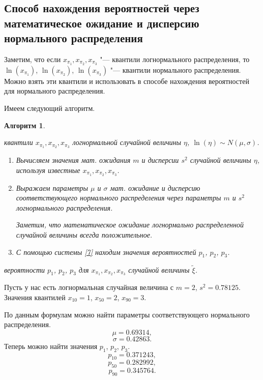 \documentclass[12pt]{article}
\newtheorem{alg}{Алгоритм}
\newenvironment{ex}{\par\noindent{\bf Пример.}}{}
\newenvironment{pr1}{\par\noindent{\bf Дано:}}{}
\newenvironment{pr2}{\par\noindent{\bf Шаги:}}{}
\newenvironment{pr3}{\par\noindent{\bf Результат:}}{}
\begin{document}
	
	\subsection{Способ нахождения вероятностей через математическое ожидание и дисперсию нормального распределения}
	Заметим, что если
	$x_{\pi_{1}}, x_{\pi_{2}}, x_{\pi_{3}}$ "--- квантили логнормального распределения, то $\ln(x_{\pi_{1}})$, $\ln(x_{\pi_{2}})$, $\ln(x_{\pi_{3}})$ "--- квантили нормального распределения. Можно взять эти квантили и использовать в способе нахождения вероятностей для нормального распределения. 
	
	Имеем следующий алгоритм.
	
	\begin{alg}\label{al1}
		\begin{pr1}
			квантили $x_{\pi_{1}}, x_{\pi_{2}}, x_{\pi_{3}}$ логнормальной случайной величины $\eta$, $\ln(\eta) \sim N(\mu, \sigma)$.
		\end{pr1}
		
		\begin{pr2}\end{pr2}
		\begin{enumerate}
			\item Вычисляем значения мат. ожидания $m$ и дисперсии $s^{2}$ случайной величины $\eta$, используя известные $x_{\pi_{1}}, x_{\pi_{2}}, x_{\pi_{3}}$.
			\item Выражаем параметры $\mu$ и $\sigma$ мат. ожидание и дисперсию соответствующего нормального распределения через параметры $m$ и $s^{2}$ логнормального распределения.
			
			Заметим, что математическое ожидание логнормально распределенной случайной величины всегда положительное.
			\item С помощью системы \eqref{7} находим значения вероятностей $p_{1}$, $p_{2}$, $p_{3}$.
		\end{enumerate}
		\begin{pr3}\end{pr3} вероятности $p_{1}$, $p_{2}$, $p_{3}$ для $x_{\pi_{1}}, x_{\pi_{2}}, x_{\pi_{3}}$ случайной величины $\tilde{\xi}$.
		
	\end{alg}
	
	\begin{ex}
		Пусть у нас есть логнормальная случайная величина с $m = 2$, $s^{2} = 0.78125$.
		Значения квантилей $x_{10} = 1$, $x_{50} = 2$, $x_{90} = 3$.
		
		По данным формулам можно найти параметры соответствующего нормального распределения.
		\[\mu=0.69314,\] 
		\[\sigma=0.42863.\]
		Теперь можно найти значения $p_{1}$, $p_{2}$, $p_{3}$.
		\[p_{10}= 0.371243,\]
		\[p_{50}= 0.282992,\]
		\[p_{90}= 0.345764.\]
	\end{ex}
\end{document}
